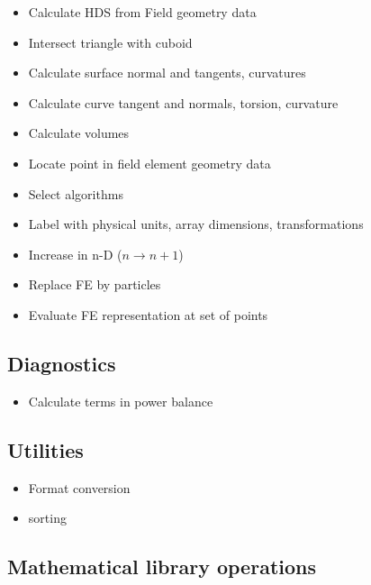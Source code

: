 \begin{itemize}
\item
  Calculate HDS from Field geometry data
\item
  Intersect triangle with cuboid
\item
  Calculate surface normal and tangents, curvatures
\item
  Calculate curve tangent and normals, torsion, curvature
\item
  Calculate volumes
\item
  Locate point in field element geometry data
\item
  Select algorithms
\item
  Label with physical units, array dimensions, transformations
\item
  Increase in n-D (\(n \rightarrow n+1\))
\item
  Replace FE by particles
\item
  Evaluate FE representation at set of points
\end{itemize}

\subsection{Diagnostics}\label{sec:diagnostics}

\begin{itemize}
\item
  Calculate terms in power balance
\end{itemize}

\subsection{Utilities}\label{sec:utilities}

\begin{itemize}
\item
  Format conversion
\item
  sorting
\end{itemize}

\subsection{Mathematical library operations}\label{sec:mathematical-library-operations}

